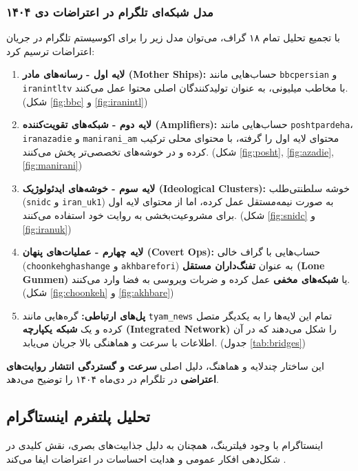 \documentclass{article}
\begin{document}
\subsubsection{مدل شبکه‌ای تلگرام در اعتراضات دی ۱۴۰۴}
با تجمیع تحلیل تمام ۱۸ گراف، می‌توان مدل زیر را برای اکوسیستم تلگرام در جریان اعتراضات ترسیم کرد:

\begin{enumerate}
	\item \textbf{لایه اول - رسانه‌های مادر (Mother Ships):} حساب‌هایی مانند \texttt{bbcpersian} و \texttt{iranintltv} با مخاطب میلیونی، به عنوان تولیدکنندگان اصلی محتوا عمل می‌کنند. (شکل \ref{fig:bbc} و \ref{fig:iranintl})
	\item \textbf{لایه دوم - شبکه‌های تقویت‌کننده (Amplifiers):} حساب‌هایی مانند \texttt{poshtpardeha}، \texttt{iranazadie} و \texttt{manirani\_am} محتوای لایه اول را گرفته، با محتوای محلی ترکیب کرده و در خوشه‌های تخصصی‌تر پخش می‌کنند. (شکل \ref{fig:posht}, \ref{fig:azadie}, \ref{fig:manirani})
	\item \textbf{لایه سوم - خوشه‌های ایدئولوژیک (Ideological Clusters):} خوشه سلطنتی‌طلب (\texttt{snidc} و \texttt{iran\_uk1}) به صورت نیمه‌مستقل عمل کرده، اما از محتوای لایه اول برای مشروعیت‌بخشی به روایت خود استفاده می‌کنند. (شکل \ref{fig:snidc} و \ref{fig:iranuk})
	\item \textbf{لایه چهارم - عملیات‌های پنهان (Covert Ops):} حساب‌هایی با گراف خالی (\texttt{choonkehghashange} و \texttt{akhbarefori}) به عنوان \textbf{تفنگ‌داران مستقل (Lone Gunmen)} یا \textbf{شبکه‌های مخفی} عمل کرده و ضربات ویروسی به فضا وارد می‌کنند. (شکل \ref{fig:choonkeh} و \ref{fig:akhbare})
	\item \textbf{پل‌های ارتباطی:} گره‌هایی مانند \texttt{tyam\_news} تمام این لایه‌ها را به یکدیگر متصل کرده و یک \textbf{شبکه یکپارچه (Integrated Network)} را شکل می‌دهند که در آن اطلاعات با سرعت و هماهنگی بالا جریان می‌یابد. (جدول \ref{tab:bridges})
\end{enumerate}

این ساختار چندلایه و هماهنگ، دلیل اصلی \textbf{سرعت و گستردگی انتشار روایت‌های اعتراضی} در تلگرام در دی‌ماه ۱۴۰۴ را توضیح می‌دهد.

	
	
	
	
	
	\subsection{تحلیل پلتفرم اینستاگرام}
	اینستاگرام با وجود فیلترینگ، همچنان به دلیل جذابیت‌های بصری، نقش کلیدی در شکل‌دهی افکار عمومی و هدایت احساسات در اعتراضات ایفا می‌کند .
	
\end{document}
